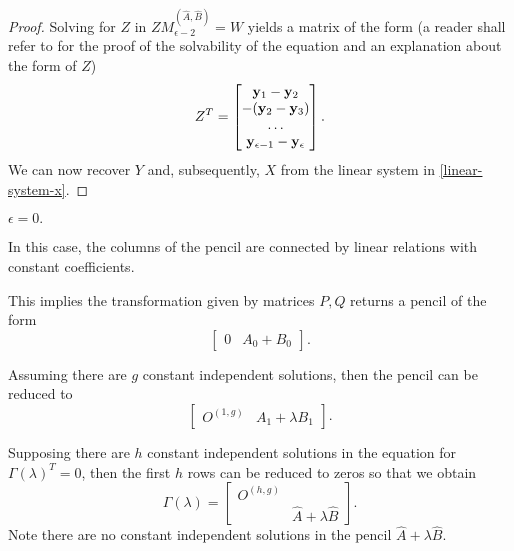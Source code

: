 \begin{cs}
\begin{proof}
        Solving for \(Z\) in \(ZM_{\epsilon-2}^{(\widehat{A}, \widehat{B})} = W\) yields a matrix of the form
        (a reader shall refer to \cite[p.34]{gantmacher} for the proof of the solvability of the equation and 
        an explanation about the form of \(Z\))
        \[
            Z^T =
            \begin{bmatrix}
                \vb{y}_{1} - \vb{y}_{2} \\
                - (\vb{y}_{2} - \vb{y}_{3}) \\
                \hdots \\
                \vb{y}_{\epsilon-1} - \vb{y}_{\epsilon}
            \end{bmatrix}.
        \]
        We can now recover \(Y\) and, subsequently, \(X\) from the linear system in \eqref{linear-system-x}.
    \end{proof}

\vspace{5mm}
    \case \(\epsilon = 0.\)

    In this case, the columns of the pencil are connected by linear relations with constant coefficients.

    This implies the transformation given by matrices \(P, Q\) returns a pencil of the form
    \[
        \begin{bmatrix}
            0 & A_{0} + B_{0}
        \end{bmatrix}.
    \]

    \pagebreak

    Assuming there are \(g\) constant independent solutions, then the pencil can be reduced to
    \[
        \begin{bmatrix}
            O^{(1, g)} & A_1 + \lambda B_1
        \end{bmatrix}.
    \]

    Supposing there are \(h\) constant independent solutions in the equation for \(\Gamma(\lambda)^T = 0\), then the first
    \(h\) rows can be reduced to zeros so that we obtain
    \[
        \widehat{\Gamma}(\lambda) = \begin{bmatrix}
            O^{(h, g)} \\
            & \widehat{A} + \lambda \widehat{B}
        \end{bmatrix}.
    \]
    Note there are no constant independent solutions in the pencil \(\widehat{A} + \lambda \widehat{B}\).
\end{cs}
\vspace{5mm}

